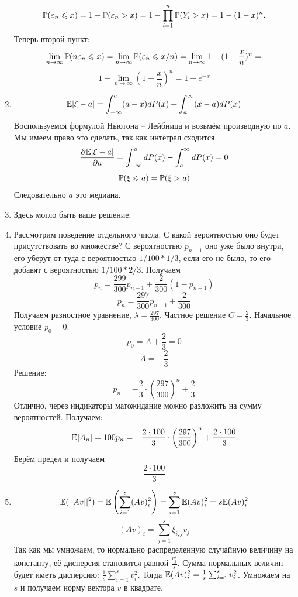 \documentclass[12pt, a4paper]{article}\usepackage[]{graphicx}\usepackage[]{color}
\begin{document}
\begin{enumerate}
\[\P (\varepsilon_n \leq x) = 1 - \P (\varepsilon_n > x) = 1 - \prod_{i = 1}^n  \P (Y_i > x) = 1 - (1 - x)^n.
\]
Теперь второй пункт:
\[
\lim_{n \rightarrow \infty} \P (n\varepsilon_n \leq x) = \lim_{n \rightarrow \infty} \P (\varepsilon_n \leq x/n) =  \lim_{n \rightarrow \infty} 1 - (1 - \frac{x}{n})^n =
\]
\[
1 - \lim_{n \rightarrow \infty} (1 - \frac{x}{n})^n = 1 - e^{-x}
\]
\item \[
\E |\xi - a| = \int_{-\infty}^a (a - x) dP(x) +  \int_{a}^{\infty} (x- a) dP(x)
\]
Воспользуемся формулой Ньютона -- Лейбница и возьмём производную по $a$. Мы имеем право это сделать, так как интеграл сходится.
\[
\frac{\partial \E|\xi - a|}{\partial a} = \int_{-\infty}^a dP(x) - \int_{a}^{\infty} dP(x) = 0
\]
\[
\P(\xi \leq a) = \P(\xi > a)
\]
Следовательно $a$ это медиана.
\item Здесь могло быть ваше решение.

\item Рассмотрим поведение отдельного числа. С какой вероятностью оно будет присутствовать во множестве? С вероятностью $p_{n-1}$ оно уже было внутри, его уберут от туда с вероятностью $1/100 * 1/3$, если его не было, то его добавят с вероятностью $1/100 * 2/3$. Получаем
\[
p_n = \frac{299}{300}p_{n - 1} + \frac{2}{300}(1 - p_{n-1})
\]
\[
p_n = \frac{297}{300}p_{n - 1} +  \frac{2}{300}
\]
Получаем разностное уравнение, $\lambda = \frac{297}{300}$. Частное решение $C = \frac{2}{3}$. Начальное условие $p_0 = 0$.
\[
p_0 = A + \frac{2}{3} = 0
\]
\[
A = -\frac{2}{3}
\]
Решение:
\[
p_n = -\frac{2}{3} \cdot \left( \frac{297}{300} \right)^n + \frac{2}{3}
\]
Отлично, через индикаторы матожидание можно разложить на сумму вероятностей. Получаем:
\[
\E |A_n| = 100 p_n = -\frac{2 \cdot 100}{3} \cdot \left( \frac{297}{300} \right)^n + \frac{2 \cdot 100}{3}
\]
Берём предел и получаем
\[
\frac{2 \cdot 100}{3}
\]

\item \[
\E(||Av||^2) = \E \left(\sum_{i = 1}^s (Av)^2_{i} \right) = \sum_{i = 1}^s \E (Av)^2_{i}  = s \E (Av)^2_{i}
\]
\[
(Av)_i = \sum_{j= 1}^s \xi_{i, j} v_j
\]
Так как мы умножаем, то нормально распределенную случайную величину на константу, её дисперсия становится равной $\frac{v_j^2}{s}$. Сумма нормальных величин будет иметь дисперсию: $\frac{1}{s}\sum_{i = 1}^s v_i^2$. Тогда $\E (Av)^2_{i} = \frac{1}{s}\sum_{i = 1}^s v_i^2$. Умножаем на $s$ и получаем норму вектора $v$ в квадрате.


\end{enumerate}
\end{document}
